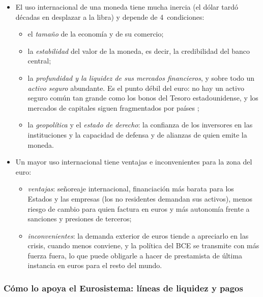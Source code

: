\documentclass[11pt]{article}
\begin{document}
\begin{itemize}
\item El uso internacional de una moneda tiene mucha inercia (el dólar tardó décadas en desplazar a la libra) y depende de 4~condiciones:
  \begin{itemize}
  \item el \emph{tamaño} de la economía y de su comercio;
  \item la \emph{estabilidad} del valor de la moneda, es decir, la credibilidad del banco central;
  \item la \emph{profundidad y la liquidez de sus mercados financieros}, y sobre todo un \emph{activo seguro} abundante. Es el punto débil del euro: no hay un activo seguro común tan grande como los bonos del Tesoro estadounidense, y los mercados de capitales siguen fragmentados por países  ;
  \item la \emph{geopolítica} y el \emph{estado de derecho}: la confianza de los inversores en las instituciones y la capacidad de defensa y de alianzas de quien emite la moneda.
  \end{itemize}
\item Un mayor uso internacional tiene ventajas e inconvenientes para la zona del euro:
  \begin{itemize}
  \item \emph{ventajas}: señoreaje internacional, financiación más barata para los Estados y las empresas (los no residentes demandan sus activos), menos riesgo de cambio para quien factura en euros y más autonomía frente a sanciones y presiones de terceros;
  \item \emph{inconvenientes}: la demanda exterior de euros tiende a apreciarlo en las crisis, cuando menos conviene, y la política del BCE se transmite con más fuerza fuera, lo que puede obligarle a hacer de prestamista de última instancia en euros para el resto del mundo.
  \end{itemize}
\end{itemize}

\subsubsection{Cómo lo apoya el Eurosistema: líneas de liquidez y pagos}\label{sec:internacional-redes}
\end{document}
